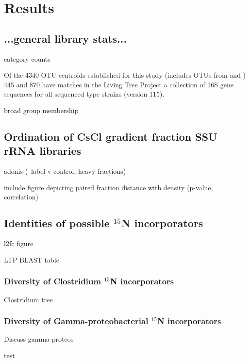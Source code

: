 \section{Results}

\subsection{...general library stats...}

category counts

Of the 4340 OTU centroids established for this study (includes OTUs from \citet{Steven_2013} and \cite{Garcia_Pichel_2013}) 445 and 870 have matches in the Living Tree Project a collection of 16S gene sequences for all sequenced type strains \cite{Yarza_2008} (version 115).

broad group membership

\subsection{Ordination of CsCl gradient fraction SSU rRNA libraries}

adonis (~label v control, heavy fractions)

include figure depicting paired fraction distance with density (p-value, correlation)

\subsection{Identities of possible $^{15}$N incorporators}

l2fc figure

LTP BLAST table

\subsubsection{Diversity of Clostridium $^{15}$N incorporators}

Clostridium tree

\subsubsection{Diversity of Gamma-proteobacterial $^{15}$N incorporators}

Discuss gamma-proteos

test



